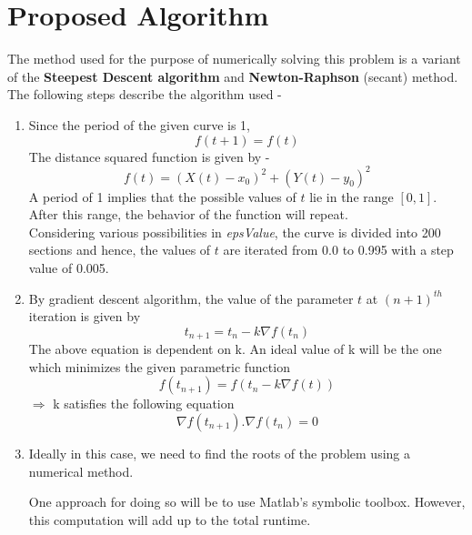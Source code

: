 \documentclass[12pt]{article}
\begin{document}
\section*{Proposed Algorithm}
The method used for the purpose of numerically solving this problem is a variant of the \textbf{Steepest Descent algorithm} and \textbf{Newton-Raphson} (secant) method. \\
The following steps describe the algorithm used -
\begin{enumerate}
    \item Since the period of the given curve is 1, 
    \begin{equation}
        f(t+1) = f(t)
    \end{equation}
    The distance squared function is given by -
    \begin{equation}
        f(t) = (X(t) - x_0)^2 + (Y(t) - y_0)^2
    \end{equation}
    A period of 1 implies that the possible values of $t$ lie in the range $[0,1]$. After this range, the behavior of the function will repeat. \\
	Considering various possibilities in \textit{epsValue}, the curve is divided into 200 sections and hence, the values of $t$ are iterated from 0.0 to 0.995 with a step value of 0.005.
    
    \item
    By gradient descent algorithm, the value of the parameter $t$ at $(n+1)^{th}$ iteration is given by
    \begin{equation}
        t_{n+1} = t_n - k\nabla f(t_n)
    \end{equation}
    The above equation is dependent on k. An ideal value of k will be the one which minimizes the given parametric function
    \begin{equation}
        f(t_{n+1}) = f(t_n - k\nabla f(t))
    \end{equation}
    $\Rightarrow$ k satisfies the following equation
    \begin{equation}
        \nabla f(t_{n+1}) . \nabla f(t_n) = 0
    \end{equation} 
    
    \item Ideally in this case, we need to find the roots of the problem using a numerical method.
    
    One approach for doing so will be to use Matlab's symbolic toolbox. However, this computation will add up to the total runtime.
    

\end{enumerate}
\end{document}
